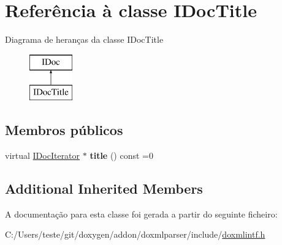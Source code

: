 \hypertarget{class_i_doc_title}{\section{Referência à classe I\-Doc\-Title}
\label{class_i_doc_title}
}
Diagrama de heranças da classe I\-Doc\-Title\begin{figure}[H]
\begin{center}
\leavevmode
\includegraphics[height=2.000000cm]{class_i_doc_title}
\end{center}
\end{figure}
\subsection*{Membros públicos}
\begin{DoxyCompactItemize}
\item 
\hypertarget{class_i_doc_title_a086416474b77e9705c01383d6f311487}{virtual \hyperlink{class_i_doc_iterator}{I\-Doc\-Iterator} $\ast$ {\bfseries title} () const =0}\label{class_i_doc_title_a086416474b77e9705c01383d6f311487}

\end{DoxyCompactItemize}
\subsection*{Additional Inherited Members}


A documentação para esta classe foi gerada a partir do seguinte ficheiro\-:\begin{DoxyCompactItemize}
\item 
C\-:/\-Users/teste/git/doxygen/addon/doxmlparser/include/\hyperlink{include_2doxmlintf_8h}{doxmlintf.\-h}\end{DoxyCompactItemize}
